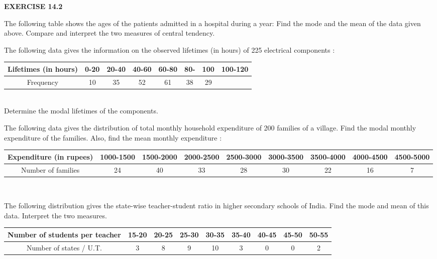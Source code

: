 {\Large \textbf{EXERCISE 14.2}}\\
\item The following table shows the ages of the patients admitted in a hospital during a year:
Find the mode and the mean of the data given above. Compare and interpret the two
measures of central tendency.
\item The following data gives the information on the observed lifetimes (in hours) of 225
electrical components :
\begin{tabular}{|c|c|c|c|c|c|c|c|}
\hline
Lifetimes (in hours)&0-20&20-40&40-60&60-80&80-&100&100-120\\
\hline
Frequency&10&35&52&61&38&29\\
\hline
\end{tabular}\\
Determine the modal lifetimes of the components.
\item The following data gives the distribution of total monthly household expenditure of 200
families of a village. Find the modal monthly expenditure of the families. Also, find the
mean monthly expenditure :
\begin{tabular}{|c|c|c|c|c|c|c|c|c|}
\hline
Expenditure (in rupees)&1000-1500&1500-2000&2000-2500&2500-3000&3000-3500&3500-4000&4000-4500& 4500-5000\\
\hline
Number of families&24&40&33&28&30&22&16&7\\
\hline
\end{tabular}\\
\item The following distribution gives the state-wise teacher-student ratio in higher
secondary schools of India. Find the mode and mean of this data. Interpret the two
measures.
\begin{tabular}{|c|c|c|c|c|c|c|c|c|}
\hline
Number of students per teacher&15-20&20-25&25-30&30-35&35-40&40-45&45-50&50-55\\
\hline
Number of states / U.T.&3&8&9&10&3&0&0&2\\
\hline
\end{tabular}\\
